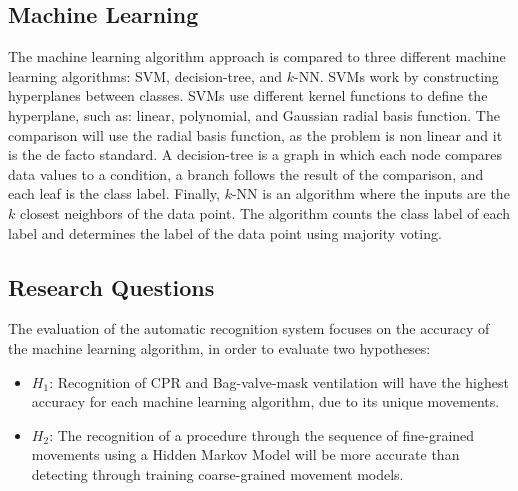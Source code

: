 \subsection{Machine Learning}
 The machine learning algorithm approach is compared to three different machine learning algorithms: SVM, decision-tree, and $k$-NN. SVMs work by constructing hyperplanes between classes. SVMs use different kernel functions to define the hyperplane, such as: linear, polynomial, and Gaussian radial basis function. The comparison will use the radial basis function, as the problem is non linear and it is the de facto standard. A decision-tree is a graph in which each node compares data values to a condition, a branch follows the result of the comparison, and each leaf is the class label. Finally, $k$-NN is an algorithm where the inputs are the $k$ closest neighbors of the data point. The algorithm counts the class label of each label and determines the label of the data point using majority voting. 
 
 \subsection{Research Questions}
 \label{sec:Data-Collection:Research-Questions}
 The evaluation of the automatic recognition system focuses on the accuracy of the machine learning algorithm, in order to evaluate two hypotheses:
 \begin{itemize}
 	\item $H_1$: Recognition of CPR and Bag-valve-mask ventilation will have the highest accuracy for each machine learning algorithm, due to its unique movements.
 	\item $H_2$: The recognition of a procedure through the sequence of fine-grained movements using a Hidden Markov Model will be more accurate than detecting through training coarse-grained movement models.
 \end{itemize}